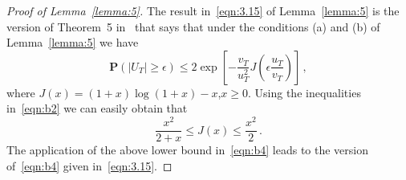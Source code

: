 \documentclass[lettersize,journal,onecolumn]{IEEEtran}
\theoremstyle{definition}
\begin{document}
\begin{proof}[Proof of Lemma~\ref{lemma:5}]
	The result in~\eqref{eqn:3.15} of Lemma~\ref{lemma:5} is the version of Theorem~5 
	in~\cite{le2021exponential} that says that under the conditions (a) and (b) of 
	Lemma~\ref{lemma:5} we have 
	\begin{equation}
		\mathbf{P}\left(\left|U_{T}\right|\geq\epsilon\right) \leq
		2\exp\left[
		-\frac{v_{T}}{u_{T}^2}J\left(\epsilon\frac{u_{T}}{v_{T}}\right)
		\right]
		\label{eqn:b4}\,,
	\end{equation}
	where $J(x)=(1+x)\log\left(1+x\right)-x$,\enspace$x\geq0$. Using the inequalities
	in~\eqref{eqn:b2} we can easily obtain that
	\begin{equation*}
		\frac{x^2}{2+x} \leq J(x) \leq \frac{x^2}{2}
		\,.
	\end{equation*}
	The application of the above lower bound in~\eqref{eqn:b4} leads to the version 
	of~\eqref{eqn:b4} given in~\eqref{eqn:3.15}.
\end{proof}
\end{document}
